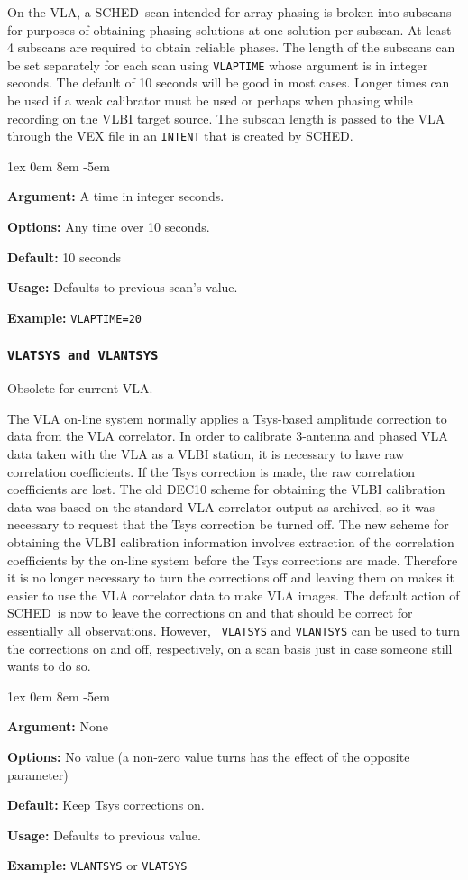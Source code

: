 \documentclass{report}
\newcommand{\sched}{{\sc SCHED}}
\newcommand{\schedb}{{\sc SCHED~}}
\newcommand{\rcwbox}[5]{
  \begin{list}{}{\parsep 1ex  \itemsep 0em
                 \leftmargin 8em  \itemindent -5em }
    \item {\bf Argument:} #1
    \item {\bf Options:}  #2
    \item {\bf Default:}  #3
    \item {\bf Usage:}    #4
    \item {\bf Example:}  #5
  \end{list}
}
\begin{document}
On the VLA, a \schedb scan intended for array phasing is broken into
subscans for purposes of obtaining phasing solutions at one solution
per subscan.  At least 4 subscans are required to obtain reliable
phases.  The length of the subscans can be set separately for each
scan using {\tt VLAPTIME} whose argument is in integer seconds.  The default
of 10 seconds will be good in most cases.  Longer times can be used if
a weak calibrator must be used or perhaps when phasing while recording
on the VLBI target source.  The subscan length is passed to the VLA 
through the VEX file in an {\tt INTENT} that is created by \sched.

\rcwbox
{A time in integer seconds.}
{Any time over 10 seconds.}
{10 seconds}
{Defaults to previous scan's value.}
{{\tt VLAPTIME=20}}



\subsubsection{\label{MP:VLATSYS}{\tt VLATSYS and VLANTSYS}}

Obsolete for current VLA.

The VLA on-line system normally applies a
Tsys-based amplitude correction to data from the VLA correlator.  In
order to calibrate 3-antenna and phased VLA data taken with the VLA as
a VLBI station, it is necessary to have raw correlation coefficients.
If the Tsys correction is made, the raw correlation coefficients are
lost. The old DEC10 scheme for obtaining the VLBI calibration data was
based on the standard VLA correlator output as archived, so it was
necessary to request that the Tsys correction be turned off. The new
scheme for obtaining the VLBI calibration information involves
extraction of the correlation coefficients by the on-line system
before the Tsys corrections are made. Therefore it is no longer
necessary to turn the corrections off and leaving them on makes it
easier to use the VLA correlator data to make VLA images. The default
action of \schedb is now to leave the corrections on and that
should be correct for essentially all observations. However, {\tt
VLATSYS} and {\tt VLANTSYS} can be used to turn the corrections on and
off, respectively, on a scan basis just in case someone still wants to
do so.

\rcwbox
{None}
{No value (a non-zero value turns has the effect of the opposite
parameter)}
{Keep Tsys corrections on.}
{Defaults to previous value.}
{{\tt VLANTSYS} or {\tt VLATSYS}}
\end{document}
